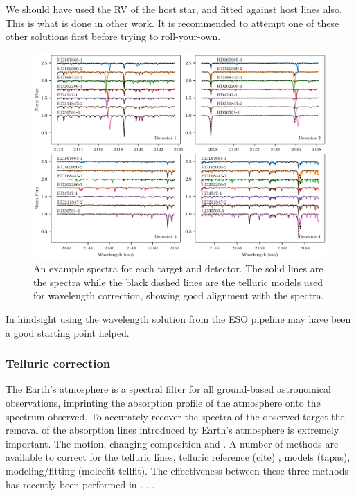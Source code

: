 We should have used the RV of the host star, and fitted against host lines also. This is what is done in other work. It is recommended to attempt one of these other solutions first before trying to roll-your-own. 

\begin{figure}
    \centering
    \includegraphics[width=1\linewidth]{figures/reduction/Spectra_examples}
    \caption{An example spectra for each target and detector. The solid lines are the spectra while the black dashed lines are the telluric models used for wavelength correction, showing good alignment with the spectra.}
    \label{fig:spectraexamples}
\end{figure}







In hindsight using the wavelength solution from the ESO pipeline may have been a good starting point helped.

\subsubsection{Telluric correction}
\label{subsec:telluric_correction}
The Earth's atmosphere is a spectral filter for all ground-based astronomical observations, imprinting the absorption profile of the atmosphere onto the spectrum observed. To accurately recover the spectra of the observed target the removal of the absorption lines introduced by Earth's atmosphere is extremely important. The motion, changing composition and .
A number of methods are available to correct for the telluric lines, telluric reference (cite) , models (tapas), modeling/fitting (molecfit tellfit). The effectiveness between these three methods has recently been performed in \cite{ulmer-moll_telluric_2018}.   . .

